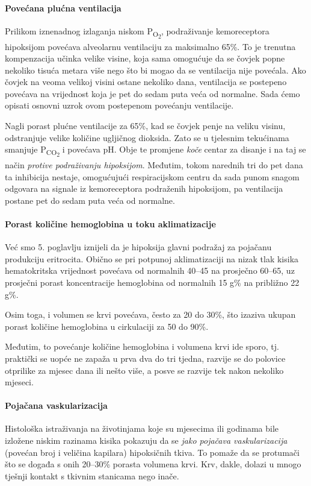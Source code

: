 \documentclass[12pt]{article}
\newcommand{\sub}[1]{\textsubscript{#1}}
\newcommand{\paro}{P\sub{O\sub{2}}}
\begin{document}
\paragraph{Povećana plućna ventilacija} Prilikom iznenadnog izlaganja niskom
\paro{}, podraživanje kemoreceptora hipoksijom povećava alveolarnu ventilaciju za
maksimalno 65\%. To je trenutna kompenzacija učinka velike visine, koja sama
omogućuje da se čovjek popne nekoliko tisuća metara više nego što bi mogao da se
ventilacija nije povećala. Ako čovjek na veoma velikoj visini ostane nekoliko
dana, ventilacija se postepeno povećava na vrijednost koja je pet do sedam puta
veća od normalne. Sada ćemo opisati osnovni uzrok ovom postepenom povećanju
ventilacije.

Nagli porast plućne ventilacije za 65\%, kad se čovjek penje na veliku visinu,
odstranjuje velike količine ugljičnog dioksida. Zato se u tjelesnim tekućinama
smanjuje P\textsubscript{CO\textsubscript{2}} i povećava pH. Obje te promjene
\emph{koče} centar za disanje i na taj se način \emph{protive podraživanju
    hipoksijom}. Međutim, tokom narednih tri do pet dana ta inhibicija nestaje,
omogućujući respiracijskom centru da sada punom snagom odgovara na signale iz
kemoreceptora podraženih hipoksijom, pa ventilacija postane pet do sedam puta
veća od normalne.

\paragraph{Porast količine hemoglobina u toku aklimatizacije} Već smo  5.
poglavlju iznijeli da je hipoksija glavni podražaj za pojačanu produkciju
eritrocita. Obično se pri potpunoj aklimatizaciji na nizak tlak kisika
hematokritska vrijednost povećava od normalnih 40--45 na prosječno 60--65, uz
prosječni porast koncentracije hemoglobina od normalnih 15 g\% na približno 22
g\%.

Osim toga, i volumen se krvi povećava, često za 20 do 30\%, što izaziva ukupan
porast količine hemoglobina u cirkulaciji za 50 do 90\%.

Međutim, to povećanje količine hemoglobina i volumena krvi ide sporo, tj.
praktički se uopće ne zapaža u prva dva do tri tjedna, razvije se do polovice
otprilike za mjesec dana ili nešto više, a posve se razvije tek nakon nekoliko
mjeseci.

\paragraph{Pojačana vaskularizacija} Histološka istraživanja na životinjama koje
su mjesecima ili godinama bile izložene niskim razinama kisika pokazuju da se
\emph{jako pojačava vaskularizacija} (povećan broj i veličina kapilara)
hipoksičnih tkiva. To pomaže da se protumači što se događa s onih 20--30\%
porasta volumena krvi. Krv, dakle, dolazi u mnogo tješnji kontakt s tkivnim
stanicama nego inače.
\end{document}
